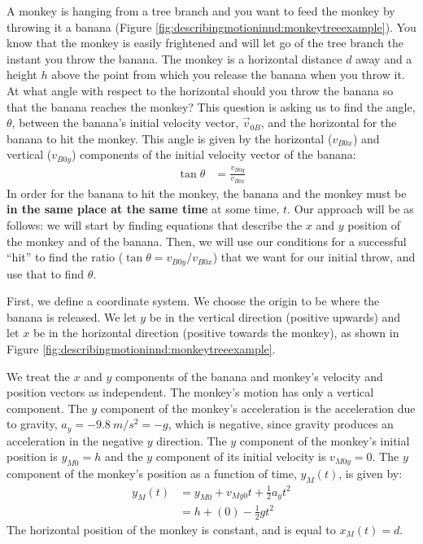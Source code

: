\begin{example}{
A monkey is hanging from a tree branch and you want to feed the monkey by throwing it a banana (Figure \ref{fig:describingmotioninnd:monkeytreeexample}). You know that the monkey is easily frightened and will let go of the tree branch the instant you throw the banana. The monkey is a horizontal distance $d$ away and a height $h$ above the point from which you release the banana when you throw it. At what angle with respect to the horizontal should you throw the banana so that the banana reaches the monkey? 
}
This question is asking us to find the angle, $\theta$, between the banana's initial velocity vector, $\vec v_{0B}$, and the horizontal for the banana to hit the monkey. This angle is given by the horizontal ($v_{B0x}$) and vertical ($v_{B0y}$) components of the initial velocity vector of the banana:
\begin{align*}
\tan\theta&=\frac{v_{B0y}}{v_{B0x}}
\end{align*}
In order for the banana to hit the monkey, the banana and the monkey must be \textbf{in the same place at the same time} at some time, $t$. Our approach will be as follows: we will start by finding equations that describe the $x$ and $y$ position of the monkey and of the banana. Then, we will use our conditions for a successful ``hit'' to find the ratio ($\tan\theta=v_{B0y}/v_{B0x}$) that we want for our initial throw, and use that to find $\theta$.

First, we define a coordinate system. We choose the origin to be where the banana is released. We let $y$ be in the vertical direction (positive upwards) and let $x$ be in the horizontal direction (positive towards the monkey), as shown in Figure \ref{fig:describingmotioninnd:monkeytreeexample}. 

We treat the $x$ and $y$ components of the banana and monkey's velocity and position vectors as independent. The monkey's motion has only a vertical component. The $y$ component of the monkey's acceleration is the acceleration due to gravity, $a_y=-\SI{9.8}{m/s^2}= -g$, which is negative, since gravity produces an acceleration in the negative $y$ direction. The $y$ component of the monkey's initial position is $y_{M0}=h$ and the $y$ component of its initial velocity is $v_{M0y}=0$. The $y$ component of the monkey's position as a function of time, $y_M(t)$, is given by:
\begin{align*}
y_M(t)&=y_{M0}+v_{My0}t+\frac{1}{2}a_yt^2\\
&=h+(0)-\frac{1}{2}gt^2
\end{align*}
The horizontal position of the monkey is constant, and is equal to $x_M(t)=d$.


\end{example}
